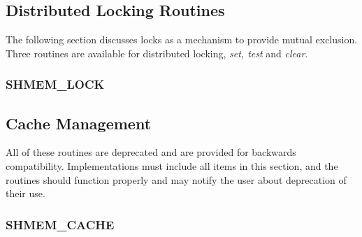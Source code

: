 \documentclass[10pt]{book}
\begin{document}
\subsection{Distributed Locking Routines}
The following section discusses \openshmem locks as a mechanism to provide
mutual exclusion. Three routines are available for distributed locking,
\textit{set, test} and \textit{clear}.

\subsubsection{\textbf{SHMEM\_LOCK}}\label{subsec:shmem_lock}






\subsection{Cache Management}
All of these routines are deprecated and are provided for backwards
compatibility.  Implementations must include all items in this section, and the
routines should function properly and may notify the user about deprecation of
their use.

\subsubsection{\textbf{SHMEM\_CACHE}}\label{subsec:shmem_cache}






\clearpage




\end{document}
